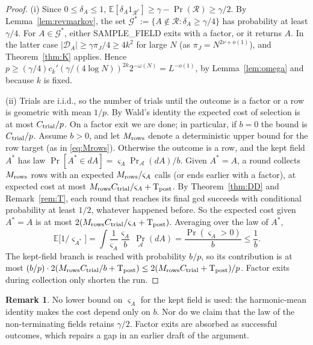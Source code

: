 \documentclass[11pt]{amsart}
\theoremstyle{definition}
\newtheorem{remark}[theorem]{Remark}
\newcommand{\cA}{\mathcal{A}}
\newcommand{\cD}{\mathcal{D}}
\newcommand{\cG}{\mathcal{G}}
\newcommand{\cR}{\mathcal{R}}
\newcommand{\Ex}{\mathbb{E}}
\newcommand{\Prob}{\Pr}
\begin{document}
\begin{proof}
(i) Since $0\le\delta_A\le1$, $\Ex[\delta_A1_{\cR^c}]\ge\gamma-\Prob(\cR)\ge\gamma/2$. By Lemma~\ref{lem:revmarkov}, the set
$\cG^*:=\{A\notin\cR:\delta_A\ge\gamma/4\}$ has probability at least $\gamma/4$. For $A\in\cG^*$, either SAMPLE\_FIELD exits
with a factor, or it returns $A$. In the latter case $|\cD_A|\ge\gamma\pi_J/4\ge4k^2$ for large $N$ (as
$\pi_J=N^{2\nu+o(1)}$), and Theorem~\ref{thm:K} applies. Hence
$p\ge(\gamma/4)c_k'(\gamma/(4\log N))^{2k}2^{-\omega(N)}=L^{-o(1)}$, by Lemma~\ref{lem:omega} and because $k$ is fixed.

(ii) Trials are i.i.d., so the number of trials until the outcome is a factor or a row is geometric with
mean $1/p$. By Wald's identity the expected cost of selection is at most $C_{\rm trial}/p$. On a factor exit we are done; in
particular, if $b=0$ the bound is $C_{\rm trial}/p$. Assume $b>0$, and let $M_{\rm rows}$ denote a deterministic upper bound for the row target (as in
\eqref{eq:Mrows}).
Otherwise the outcome is a row, and the kept field $A^*$ has law $\Prob[A^*\in dA]=\varsigma_A\Prob_\cA(dA)/b$. Given $A^*=A$, a
round collects $M_{\rm rows}$ rows with an expected $M_{\rm rows}/\varsigma_A$ calls (or ends earlier with a factor), at expected cost at most
$M_{\rm rows}C_{\rm trial}/\varsigma_A+\mathrm T_{\rm post}$. By Theorem~\ref{thm:DD} and Remark~\ref{rem:T}, each round that reaches its final gcd succeeds with
conditional probability at least $1/2$, whatever happened before. So the expected cost given $A^*=A$ is at most
$2(M_{\rm rows}C_{\rm trial}/\varsigma_A+\mathrm T_{\rm post})$. Averaging over the law of $A^*$,
\[
\Ex\bigl[1/\varsigma_{A^*}\bigr]=\int\frac1{\varsigma_A}\frac{\varsigma_A}{b}\,\Prob_\cA(dA)=\frac{\Prob(\varsigma_A>0)}{b}\le\frac1b.
\]
The kept-field branch is reached with probability $b/p$, so its contribution is at most
$(b/p)\cdot2(M_{\rm rows}C_{\rm trial}/b+\mathrm T_{\rm post})\le2(M_{\rm rows}C_{\rm trial}+\mathrm T_{\rm post})/p$. Factor exits during collection only shorten the run.
\end{proof}

\begin{remark}
No lower bound on $\varsigma_A$ for the kept field is used: the harmonic-mean identity makes the cost
depend only on $b$. Nor do we claim that the law of the non-terminating fields retains $\gamma/2$. Factor exits are
absorbed as successful outcomes, which repairs a gap in an earlier draft of the argument.
\end{remark}
\end{document}
